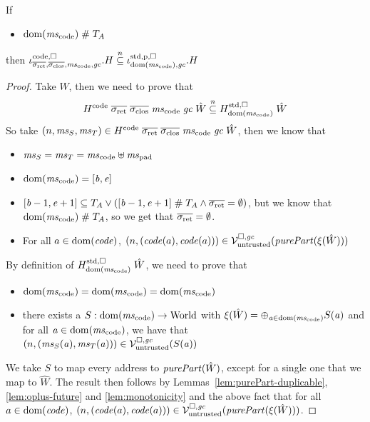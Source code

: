 \documentclass[a4paper]{article}
\begin{document}
\begin{lemma}
  \label{lem:codereg-untrusted-stdreg}
  If
  \begin{itemize}
  \item $\dom(\mscode) \mathrel{\#} \ta$
  \end{itemize}
  then $\codereg{\sigrets,\sigcloss,\mscode,\gc}.H \nsubeq \stdreg{\dom(\mscode),\gc}{\pur}.H$ 
\end{lemma}
\begin{proof}
  Take $\hat{W}$, then we need to prove that
  \begin{equation*}
    H^\mathrm{code}\;\sigrets\;\sigcloss\;\mscode\;\gc \; \hat{W} \nsubeq H_{\dom(\mscode)}^{\mathrm{std},\square}\;\hat{W}
  \end{equation*}
  So take $\npair{\ms_S,\ms_T} \in H^\mathrm{code}\;\sigrets\;\sigcloss\;\mscode\;\gc \; \hat{W}$, then we know that
  \begin{itemize}
  \item $\ms_S = \ms_T = \mscode\uplus\mspad$
  \item $\dom(\mscode) =[\baddr,\eaddr]$
  \item $[\baddr-1,\eaddr+1] \subseteq \ta \vee ([\baddr-1,\eaddr+1]\mathrel{\#} \ta \wedge \sigrets = \emptyset)$, but we know that $\dom(\mscode) \mathrel{\#} \ta$, so we get that $\sigrets = \emptyset$.
  \item For all $a \in \mathrm{dom}(\mathit{code})$, $\npair{(\code(a),\code(a))} \in \lrv(\purePart{\xi(\hat{W})})$
  \end{itemize}

  By definition of $H_{\dom(\mscode)}^{\mathrm{std},\square}\;\hat{W}$, we need to prove that
  \begin{itemize}
  \item $\dom(\mscode) = \dom(\mscode) = \dom(\mscode)$
  \item there exists a $S : \dom(\mscode) \fun \World$ with $\xi(\hat{W}) = \oplus_{\aaddr\in\dom(\mscode)} S(\aaddr)$ and for all $\aaddr \in \dom(\mscode)$, we have that $\left(n,(\mathit{ms}_S(\mathit{a}),\mathit{ms}_T(\mathit{a}))\right) \in \mathcal{V}^{\square,\mathit{gc}}_{\mathrm{untrusted}}(S(\mathit{a}))$
  \end{itemize}

  We take $S$ to map every address to $\purePart{\hat{W}}$, except for a single one that we map to $\hat{W}$.
  The result then follows by Lemmas~\ref{lem:purePart-duplicable}, \ref{lem:oplus-future} and \ref{lem:monotonicity} and the above fact that for all $a \in \mathrm{dom}(\mathit{code})$, $\npair{(\code(a),\code(a))} \in \lrv(\purePart{\xi(\hat{W})})$.
\end{proof}
\end{document}
